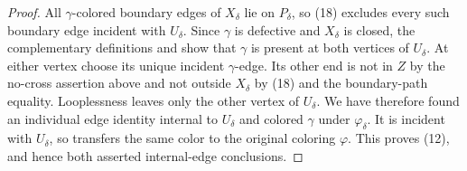 \begin{proof}
All $\gamma$-colored boundary edges of $X_\delta$ lie on $P_\delta$, so
(18) excludes every such boundary edge incident with $U_\delta$.  Since
$\gamma$ is defective and $X_\delta$ is closed, the complementary
definitions  and  show
that $\gamma$ is present at both vertices of $U_\delta$.  At either
vertex choose its unique incident $\gamma$-edge.  Its other end is not in
$Z$ by the no-cross assertion above and not outside $X_\delta$ by (18)
and the boundary-path equality.  Looplessness leaves only the other
vertex of $U_\delta$.  We have therefore found an individual edge
identity internal to $U_\delta$ and colored $\gamma$ under
$\varphi_\delta$.  It is incident with $U_\delta$, so
 transfers the same color to the
original coloring $\varphi$.  This proves (12), and hence both asserted
internal-edge conclusions.
\end{proof}
